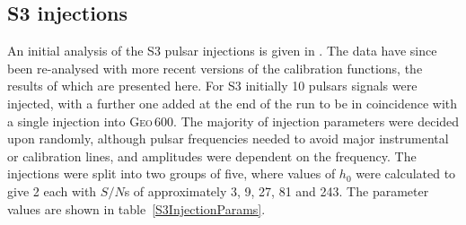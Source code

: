 \subsection{S3 injections}
An initial analysis of the S3 pulsar injections is given in \cite{Dupuis:2004}. The data have
since been re-analysed with more recent versions of the calibration functions, the results of which
are presented here. For S3 initially 10 pulsars signals were injected, with a further one added at
the end of the run to be in coincidence with a single injection into G\textsc{eo}\,600. The majority
of injection parameters were decided upon randomly, although pulsar frequencies needed to avoid
major instrumental or calibration lines, and amplitudes were dependent on the frequency. The
injections were split into two groups of five, where values of $h_0$ were calculated to give 2 each
with $S/N$s of approximately 3, 9, 27, 81 and 243. The parameter values are shown in
table~\ref{S3InjectionParams}.
